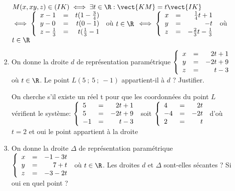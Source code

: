 \documentclass[12pt]{cornouaille}
\begin{document}
\begin{exercice}
\begin{enumerate}
\begin{enumerate}
\begin{solution}
$M(x,xy,z) \in (IK) \iff \exists t \in \R : \vect{KM}=t\vect{IK}$\\
$\iff \left\{\begin{array}{l c r}
x-1 &=& t(1-\frac{3}{4}) \\
y-0 &= & t(0-1) \\ 
z-\frac{1}{3} &=&t (\frac{1}{3}-1
 \end{array}\right.$ où $t \in \R$ $\iff \left\{\begin{array}{l c r}
x &=& \frac{1}{4}t + 1\\
y &= &-  t \\ 
z &=&-\frac{2}{3}t - \frac{1}{3}
 \end{array}\right.$ où $t \in \R$
\end{solution}
	\item On donne la droite $d$ de 
représentation paramétrique $\left\{\begin{array}{l c r}
x &=& 2t + 1\\
y &= &- 2 t + 9\\ 
z &=&t - 3
 \end{array}\right.$ où $t \in \R$.\newline
Le point $L(5~;~5~;~-1)$ appartient-il à $d$ ? Justifier.

\begin{solution}
On cherche s'il existe un réel t pour que les coordonnées du point $L$ vérifient le système: $\left\{\begin{array}{l c r}
5 &=& 2t + 1\\
5 &= &- 2 t + 9\\ 
-1 &=&t - 3
 \end{array}\right.$ soit $\left\{\begin{array}{l c r}
4 &=& 2t \\
-4 &= &- 2 t \\ 
2 &=&t 
 \end{array}\right.$ d'où $ t=2$ et oui le point appartient à la droite
\end{solution}
\item On donne la droite $\Delta$ de 
représentation paramétrique $\left\{\begin{array}{l c r}
x &=& -1-3t\\
y &= &7+t\\ 
z &=&-3-2t
 \end{array}\right.$ où $t \in \R$.\newline
Les droites $d$ et $\Delta$ sont-elles sécantes ? Si oui en quel point ?


\end{enumerate}
\end{enumerate}
\end{exercice}
\end{document}
